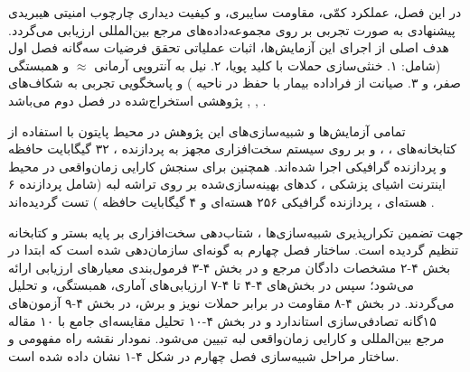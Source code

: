 




در این فصل، عملکرد کمّی، مقاومت سایبری، و کیفیت دیداری چارچوب امنیتی هیبریدی پیشنهادی به صورت تجربی بر روی مجموعه‌داده‌های مرجع بین‌المللی ارزیابی می‌گردد. هدف اصلی از اجرای این آزمایش‌ها، اثبات عملیاتی تحقق فرضیات سه‌گانه فصل اول (شامل: ۱. خنثی‌سازی حملات  با کلید پویا، ۲. نیل به آنتروپی آرمانی  \ensuremath{\approx}  و همبستگی صفر، و ۳. صیانت از فراداده بیمار با حفظ  در ناحیه ) و پاسخگویی تجربی به شکاف‌های پژوهشی استخراج‌شده در فصل دوم می‌باشد , , .\par



تمامی آزمایش‌ها و شبیه‌سازی‌های این پژوهش در محیط پایتون  با استفاده از کتابخانه‌های ، ،  و  بر روی سیستم سخت‌افزاری مجهز به پردازنده ، ۳۲ گیگابایت حافظه  و پردازنده گرافیکی  اجرا شده‌اند. همچنین برای سنجش کارایی زمان‌واقعی در محیط اینترنت اشیای پزشکی ، کدهای بهینه‌سازی‌شده بر روی تراشه لبه  (شامل پردازنده ۶ هسته‌ای ، پردازنده گرافیکی ۲۵۶ هسته‌ای  و ۴ گیگابایت حافظه ) تست گردیده‌اند .\par



جهت تضمین تکرارپذیری شبیه‌سازی‌ها ، شتاب‌دهی سخت‌افزاری بر پایه بستر  و کتابخانه  تنظیم گردیده است. ساختار فصل چهارم به گونه‌ای سازمان‌دهی شده است که ابتدا در بخش ۴{-}۲ مشخصات دادگان مرجع و در بخش ۴{-}۳ فرمول‌بندی معیارهای ارزیابی ارائه می‌شود؛ سپس در بخش‌های ۴{-}۴ تا ۴{-}۷ ارزیابی‌های آماری، همبستگی،  و  تحلیل می‌گردند. در بخش ۴{-}۸ مقاومت در برابر حملات نویز و برش، در بخش ۴{-}۹ آزمون‌های ۱۵گانه تصادفی‌سازی استاندارد  و در بخش ۴{-}۱۰ تحلیل مقایسه‌ای جامع با ۱۰ مقاله مرجع بین‌المللی و کارایی زمان‌واقعی لبه تبیین می‌شود. نمودار نقشه راه مفهومی و ساختار مراحل شبیه‌سازی فصل چهارم در شکل ۴{-}۱ نشان داده شده است.\par

